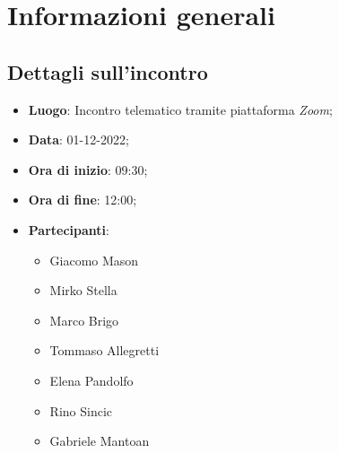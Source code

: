 \section{Informazioni generali}

\subsection{Dettagli sull'incontro}
\begin{itemize}
\item \textbf{Luogo}: Incontro telematico tramite piattaforma \textit{Zoom};
\item \textbf{Data}: 01-12-2022;
\item \textbf{Ora di inizio}: 09:30;
\item \textbf{Ora di fine}: 12:00;
\item \textbf{Partecipanti}: 
\begin{itemize}
	\item Giacomo Mason
	\item Mirko Stella
	\item Marco Brigo
	\item Tommaso Allegretti
	\item Elena Pandolfo
	\item Rino Sincic
	\item Gabriele Mantoan
\end{itemize}
\end{itemize}



